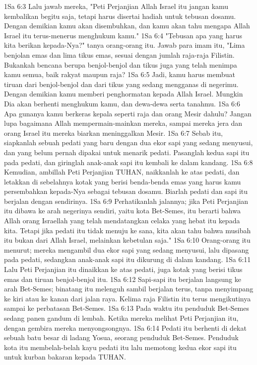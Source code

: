 1Sa 6:3  Lalu jawab mereka, "Peti Perjanjian Allah Israel itu jangan kamu kembalikan begitu saja, tetapi harus disertai hadiah untuk tebusan dosamu. Dengan demikian kamu akan disembuhkan, dan kamu akan tahu mengapa Allah Israel itu terus-menerus menghukum kamu."
1Sa 6:4  "Tebusan apa yang harus kita berikan kepada-Nya?" tanya orang-orang itu. Jawab para imam itu, "Lima benjolan emas dan lima tikus emas, sesuai dengan jumlah raja-raja Filistin. Bukankah bencana berupa benjol-benjol dan tikus juga yang telah menimpa kamu semua, baik rakyat maupun raja?
1Sa 6:5  Jadi, kamu harus membuat tiruan dari benjol-benjol dan dari tikus yang sedang mengganas di negerimu. Dengan demikian kamu memberi penghormatan kepada Allah Israel. Mungkin Dia akan berhenti menghukum kamu, dan dewa-dewa serta tanahmu.
1Sa 6:6  Apa gunanya kamu berkeras kepala seperti raja dan orang Mesir dahulu? Jangan lupa bagaimana Allah mempermain-mainkan mereka, sampai mereka jera dan orang Israel itu mereka biarkan meninggalkan Mesir.
1Sa 6:7  Sebab itu, siapkanlah sebuah pedati yang baru dengan dua ekor sapi yang sedang menyusui, dan yang belum pernah dipakai untuk menarik pedati. Pasanglah kedua sapi itu pada pedati, dan giringlah anak-anak sapi itu kembali ke dalam kandang.
1Sa 6:8  Kemudian, ambillah Peti Perjanjian TUHAN, naikkanlah ke atas pedati, dan letakkan di sebelahnya kotak yang berisi benda-benda emas yang harus kamu persembahkan kepada-Nya sebagai tebusan dosamu. Biarlah pedati dan sapi itu berjalan dengan sendirinya.
1Sa 6:9  Perhatikanlah jalannya; jika Peti Perjanjian itu dibawa ke arah negerinya sendiri, yaitu kota Bet-Semes, itu berarti bahwa Allah orang Israellah yang telah mendatangkan celaka yang hebat itu kepada kita. Tetapi jika pedati itu tidak menuju ke sana, kita akan tahu bahwa musibah itu bukan dari Allah Israel, melainkan kebetulan saja."
1Sa 6:10  Orang-orang itu menurut; mereka mengambil dua ekor sapi yang sedang menyusui, lalu dipasang pada pedati, sedangkan anak-anak sapi itu dikurung di dalam kandang.
1Sa 6:11  Lalu Peti Perjanjian itu dinaikkan ke atas pedati, juga kotak yang berisi tikus emas dan tiruan benjol-benjol itu.
1Sa 6:12  Sapi-sapi itu berjalan langsung ke arah Bet-Semes; binatang itu melenguh sambil berjalan terus, tanpa menyimpang ke kiri atau ke kanan dari jalan raya. Kelima raja Filistin itu terus mengikutinya sampai ke perbatasan Bet-Semes.
1Sa 6:13  Pada waktu itu penduduk Bet-Semes sedang panen gandum di lembah. Ketika mereka melihat Peti Perjanjian itu, dengan gembira mereka menyongsongnya.
1Sa 6:14  Pedati itu berhenti di dekat sebuah batu besar di ladang Yosua, seorang penduduk Bet-Semes. Penduduk kota itu membelah-belah kayu pedati itu lalu memotong kedua ekor sapi itu untuk kurban bakaran kepada TUHAN.
